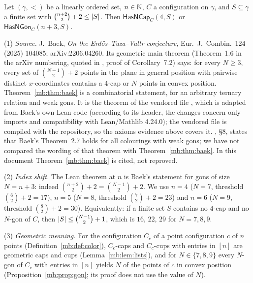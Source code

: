 \begin{theorem}\label{mb:thm:baek}
Let $(\gamma,<)$ be a linearly ordered set, $n\in\mathbb N$, $C$ a configuration on $\gamma$, and $S\subseteq\gamma$ a finite
set with $\binom{n+2}{2}+2\le\lvert S\rvert$. Then $\mathsf{HasNCap}_C(4,S)$ or $\mathsf{HasNGon}_C(n+3,S)$.
\end{theorem}

\begin{remark}\label{mb:rem:baek}
(1) \emph{Source.} J.~Baek, \emph{On the Erd\H{o}s--Tuza--Valtr conjecture}, Eur.\ J.\ Combin.\ 124 (2025) 104085;
arXiv:2206.04260. Its geometric main theorem (Theorem~1.6 in the arXiv numbering, quoted in
, proof of Corollary~7.2) says: for every $N\ge3$, every set of $\binom{N-1}{2}+2$ points in
the plane in general position with pairwise distinct $x$-coordinates contains a $4$-cap or $N$ points in convex
position. Theorem~\ref{mb:thm:baek} is a combinatorial statement, for an arbitrary ternary relation and weak gons. It
is the theorem  of the vendored file , which is adapted from
Baek's own Lean code (according to its header, the changes concern only imports and compatibility with Lean/Mathlib
4.24.0); the vendored file is compiled with the repository, so the axioms evidence above covers it.
, \S8, states that Baek's Theorem~2.7 holds for all colourings with weak gons; we have not
compared the wording of that theorem with Theorem~\ref{mb:thm:baek}. In this document Theorem~\ref{mb:thm:baek} is
cited, not reproved.

(2) \emph{Index shift.} The Lean theorem  at $n$ is Baek's statement for gons of size $N=n+3$: indeed
$\binom{n+2}{2}+2=\binom{N-1}{2}+2$. We use $n=4$ ($N=7$, threshold $\binom62+2=17$), $n=5$ ($N=8$, threshold
$\binom72+2=23$) and $n=6$ ($N=9$, threshold $\binom82+2=30$). Equivalently: if a finite set $S$ contains no $4$-cap and
no $N$-gon of $C$, then $\lvert S\rvert\le\binom{N-1}{2}+1$, which is $16$, $22$, $29$ for $N=7,8,9$.

(3) \emph{Geometric meaning.} For the configuration $C_c$ of a point configuration $c$ of $n$ points
(Definition~\ref{mb:def:color}), $C_c$-caps and $C_c$-cups with entries in $[n]$ are geometric caps and cups
(Lemma~\ref{mb:lem:lists}), and for $N\in\{7,8,9\}$ every $N$-gon of $C_c$ with entries in $[n]$ yields $N$ of the
points of $c$ in convex position (Proposition~\ref{mb:prop:gon}; its proof does not use the value of $N$).
\end{remark}


